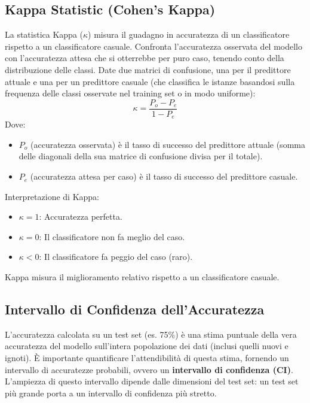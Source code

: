 \documentclass{article}
\begin{document}
\subsection{Kappa Statistic (Cohen's Kappa)}
La statistica Kappa ($\kappa$) misura il guadagno in accuratezza di un classificatore rispetto a un classificatore casuale. Confronta l'accuratezza osservata del modello con l'accuratezza attesa che si otterrebbe per puro caso, tenendo conto della distribuzione delle classi.
Date due matrici di confusione, una per il predittore attuale e una per un predittore casuale (che classifica le istanze basandosi sulla frequenza delle classi osservate nel training set o in modo uniforme):
$$ \kappa = \frac{P_o - P_e}{1 - P_e} $$
Dove:
\begin{itemize}
    \item $P_o$ (accuratezza osservata) è il tasso di successo del predittore attuale (somma delle diagonali della sua matrice di confusione divisa per il totale).
    \item $P_e$ (accuratezza attesa per caso) è il tasso di successo del predittore casuale.
\end{itemize}
Interpretazione di Kappa:
\begin{itemize}
    \item $\kappa = 1$: Accuratezza perfetta.
    \item $\kappa = 0$: Il classificatore non fa meglio del caso.
    \item $\kappa < 0$: Il classificatore fa peggio del caso (raro).
\end{itemize}
Kappa misura il miglioramento relativo rispetto a un classificatore casuale.

\subsection{Intervallo di Confidenza dell'Accuratezza}
L'accuratezza calcolata su un test set (es. 75\%) è una stima puntuale della vera accuratezza del modello sull'intera popolazione dei dati (inclusi quelli nuovi e ignoti). È importante quantificare l'attendibilità di questa stima, fornendo un intervallo di accuratezze probabili, ovvero un \textbf{intervallo di confidenza (CI)}.
L'ampiezza di questo intervallo dipende dalle dimensioni del test set: un test set più grande porta a un intervallo di confidenza più stretto.
\end{document}
